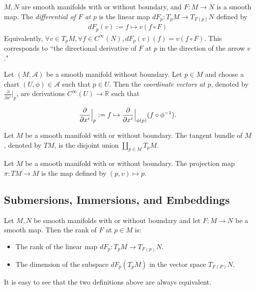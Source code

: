 \begin{defn}[Differential]
  $M, N$ are smooth manifolds with or without boundary, and $F: M \rightarrow N$ is a smooth map.
  The \textit{differential of $F$ at $p$} is the linear map $dF_p: T_pM \rightarrow T_{F(p)}N$ defined by 
  \begin{align*}
    dF_p(v) := f \mapsto v(f \circ F)
  \end{align*}
  Equivalently, $\forall v \in T_pM, \forall f \in C^{\infty}(N), dF_p(v)(f) = v(f \circ F)$.
  This corresponds to ``the directional derivative of $F$ at $p$ in the direction of the arrow $v$."
\end{defn}

\begin{defn}
  Let $(M, \mathcal{A})$ be a smooth manifold without boundary.
  Let $p \in M$ and choose a chart $(U, \phi) \in \mathcal{A}$ such that $p \in U$.
  Then the \textit{coordinate vectors at $p$}, denoted by $\frac{\partial}{\partial x^i}\vert_p$, are derivations $C^{\infty}(U) \rightarrow \mathbb{R}$ such that

  \begin{align*}
    \frac{\partial}{\partial x^i}\Big{\vert}_p := f \mapsto \frac{\partial}{\partial x^i}\Big{\vert}_{\phi(p)}(f \circ \phi^{-1}).
  \end{align*}
\end{defn}

\begin{defn}
  Let $M$ be a smooth manifold with or without boundary.
  The tangent bundle of $M$, denoted by $TM$, is the disjoint union $\coprod_{p \in M} T_pM$.
\end{defn}

\begin{defn}
  Let $M$ be a smooth manifold with or without boundary.
  The projection map $\pi: TM \rightarrow M$ is the map defined by $(p, v) \mapsto p$.
\end{defn}

\subsection{Submersions, Immersions, and Embeddings}

\begin{defn}[Rank]
  Let $M, N$ be smooth manifolds with or without boundary and let $F: M \rightarrow N$ be a smooth map.
  Then the rank of $F$ at $p \in M$ is:
  \begin{itemize}
    \item
      The rank of the linear map $dF_p: T_pM \rightarrow T_{F(p)}N$.
    \item
      The dimension of the subspace $dF_p(T_pM)$ in the vector space $T_{F(P)}N$.
  \end{itemize}
  It is easy to see that the two definitions above are always equivalent.
\end{defn}

